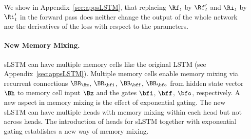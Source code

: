 \documentclass[dvipsnames]{article}
\begin{document}
We show in Appendix~\ref{sec:appsLSTM}, that replacing
$\Rf_t$ by $\Rf'_t$ and $\Ri_t$ by $\Ri'_t$
in the forward pass does neither
change the output of the whole network nor
the derivatives of the loss with respect to the
parameters.
\paragraph{New Memory Mixing.}
sLSTM can have multiple memory cells like the original LSTM
(see Appendix~\ref{sec:appsLSTM}).
Multiple memory cells enable memory mixing via
recurrent connections $\BR_{\Bz}$, $\BR_{\bfi}$, $\BR_{\bff}$, $\BR_{\bfo}$
from hidden state vector $\Bh$ to memory cell input $\Bz$ and the gates
$\bfi$, $\bff$, $\bfo$, respectively.
A new aspect in memory mixing is the effect of exponential gating.
The new sLSTM can have multiple heads with memory mixing
within each head but not across heads.
The introduction of heads for sLSTM together with exponential gating
establishes a new way of memory mixing.
\end{document}
